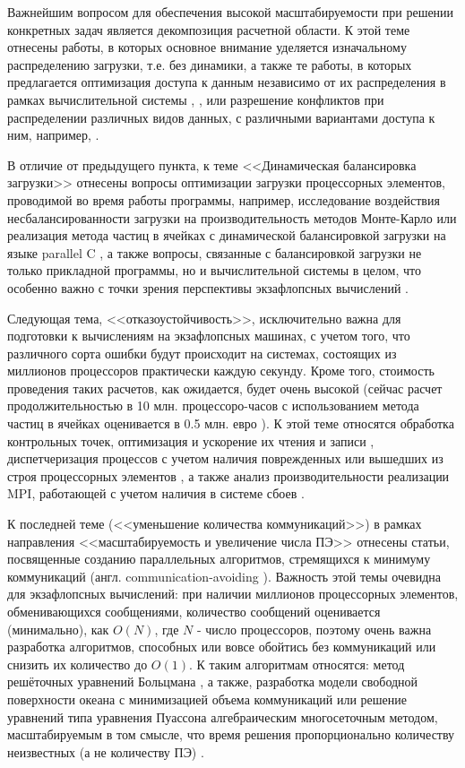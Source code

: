  Важнейшим вопросом для обеспечения высокой масштабируемости при решении конкретных задач является декомпозиция расчетной области. К этой теме отнесены работы, в которых основное внимание уделяется изначальному распределению загрузки, т.е. без динамики, а также те работы, в которых предлагается оптимизация доступа к данным независимо от их распределения в рамках вычислительной системы \cite{Srinivasa2012256}, \cite{Lieb2014246}, или разрешение конфликтов при распределении различных видов данных, с различными вариантами доступа к ним, например, \cite{Sitaraman2016,Balzuweit201667}.

В отличие от предыдущего пункта, к теме <<Динамическая балансировка загрузки>> отнесены вопросы оптимизации загрузки процессорных элементов, проводимой во время работы программы, например, исследование воздействия несбалансированности загрузки на производительность методов Монте-Карло \cite{Siegel2013901} или реализация метода частиц в ячейках с динамической балансировкой загрузки на языке parallel C \cite{Verleye201310}, а также вопросы, связанные с балансировкой загрузки не только прикладной программы, но и вычислительной системы в целом, что особенно важно с точки зрения перспективы экзафлопсных вычислений \cite{Dong20121254}.



Следующая тема, <<отказоустойчивость>>, исключительно важна для подготовки к вычислениям на экзафлопсных машинах,
с учетом того, что различного сорта ошибки будут происходит на системах, состоящих из миллионов процессоров практически каждую секунду. Кроме того, стоимость проведения таких расчетов, как ожидается, будет очень высокой (сейчас расчет продолжительностью в 10 млн. процессоро-часов с использованием метода частиц в ячейках оценивается в 0.5 млн. евро \cite{Vieira}). К этой теме относятся
обработка контрольных точек, оптимизация и ускорение их чтения и записи \cite{Nicolae2013698,Casanova20157}, диспетчеризация процессов с учетом наличия поврежденных или вышедших из строя процессорных элементов \cite{Defour20161},
а также анализ производительности реализации MPI, работающей с учетом наличия в системе сбоев \cite{Hursey201215}.

К последней теме (<<уменьшение количества коммуникаций>>) в рамках направления <<масштабируемость и увеличение числа ПЭ>> отнесены статьи, посвященные созданию параллельных алгоритмов, стремящихся к минимуму коммуникаций (англ. communication-avoiding \cite{Dongarra2013212}). Важность этой темы очевидна для экзафлопсных вычислений: при наличии миллионов процессорных элементов, обменивающихся сообщениями, количество сообщений оценивается (минимально), как $O(N)$, где $N$ - число процессоров, поэтому очень важна разработка алгоритмов, способных или вовсе обойтись без коммуникаций или снизить их количество до $O(1)$. К таким алгоритмам относятся: метод решёточных уравнений Больцмана \cite{Wittmann2013924,Safi2016170}, а также, разработка модели свободной поверхности океана с минимизацией объема коммуникаций\cite{Newman2016877} или решение уравнений типа уравнения Пуассона алгебраическим многосеточным методом, масштабируемым в том смысле, что время решения пропорционально количеству неизвестных (а не количеству ПЭ) \cite{Notay2015237}.

